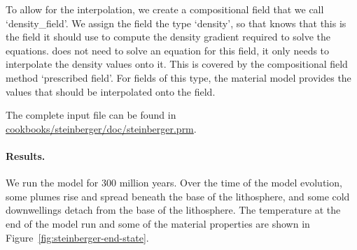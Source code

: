 To allow for the interpolation, we create a compositional field that we call `density\_field'. 
We assign the field the type `density', so that \aspect{} knows that this is the field it should use to compute the density gradient required to solve the equations. \aspect{} does not need to solve an 
equation for this field, it only needs to interpolate the density values onto it. 
This is covered by the compositional field method `prescribed field'. 
For fields of this type, the material model provides the values that should be 
interpolated onto the field.


The complete input file can be found in \url{cookbooks/steinberger/doc/steinberger.prm}. 

\paragraph{Results.} We run the model for 300 million years. Over the time of the model evolution, some plumes rise and spread beneath the base of the lithosphere, and some cold downwellings detach from the base of the lithosphere. The temperature at the end of the model run and some of the material properties are shown in Figure~\ref{fig:steinberger-end-state}. 


